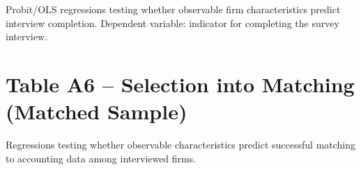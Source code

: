 \documentclass[12pt]{article}
\begin{document}
Probit/OLS regressions testing whether observable firm characteristics predict
interview completion. Dependent variable: indicator for completing the survey interview.



\clearpage
\section{Table A6 -- Selection into Matching (Matched Sample)}

Regressions testing whether observable characteristics predict successful matching
to accounting data among interviewed firms.


\end{document}
